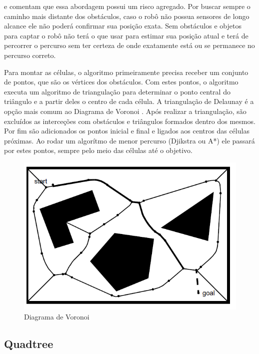 \cite{Siegwart2004} e \cite{Choset2005} comentam que essa abordagem possui um risco agregado. Por buscar sempre o caminho mais distante dos obstáculos, caso o robô não possua sensores de longo alcance ele não poderá confirmar sua posição exata. Sem obstáculos e objetos para captar o robô não terá o que usar para estimar sua posição atual e terá de percorrer o percurso sem ter certeza de onde exatamente está ou se permanece no percurso correto.

Para montar as células, o algoritmo primeiramente precisa receber um conjunto de pontos, que são os vértices dos obstáculos. Com estes pontos, o algoritmo executa um algoritmo de triangulação para determinar o ponto central do triângulo e a partir deles o centro de cada célula. A triangulação de Delaunay é a opção mais comum ao Diagrama de Voronoi \cite{Souza2008}. Após realizar a triangulação, são excluídos as interceções com obstáculos e triângulos formados dentro dos mesmos. Por fim são adicionados os pontos inicial e final e ligados aos centros das células próximas. Ao rodar um algorítmo de menor percurso (Djikstra ou A*) ele passará por estes pontos, sempre pelo meio das células até o objetivo.

\begin{figure}[h]
	\centering
	\label{fig08}
		\includegraphics[keepaspectratio=true,scale=0.6]{figuras/8voronoi.png}
	\caption{Diagrama de Voronoi \cite{Siegwart2004}}
\end{figure}

\subsection{Quadtree}

